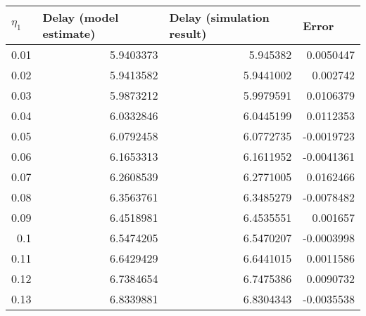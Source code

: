 \begin{table}
\begin{latin}
		\begin{tabular}{rrrr}
			\hline
			\multicolumn{1}{l}{$\eta_1$} & \multicolumn{1}{l}{Delay (model estimate)} & \multicolumn{1}{l}{Delay (simulation result)} & \multicolumn{1}{l}{Error} \\ \hline
			0.01                     & 5.9403373                                  & 5.945382                                      & 0.0050447                 \\
			0.02                     & 5.9413582                                  & 5.9441002                                     & 0.002742                  \\
			0.03                     & 5.9873212                                  & 5.9979591                                     & 0.0106379                 \\
			0.04                     & 6.0332846                                  & 6.0445199                                     & 0.0112353                 \\
			0.05                     & 6.0792458                                  & 6.0772735                                     & -0.0019723                \\
			0.06                     & 6.1653313                                  & 6.1611952                                     & -0.0041361                \\
			0.07                     & 6.2608539                                  & 6.2771005                                     & 0.0162466                 \\
			0.08                     & 6.3563761                                  & 6.3485279                                     & -0.0078482                \\
			0.09                     & 6.4518981                                  & 6.4535551                                     & 0.001657                  \\
			0.1                      & 6.5474205                                  & 6.5470207                                     & -0.0003998                \\
			0.11                     & 6.6429429                                  & 6.6441015                                     & 0.0011586                 \\
			0.12                     & 6.7384654                                  & 6.7475386                                     & 0.0090732                 \\
			0.13                     & 6.8339881                                  & 6.8304343                                     & -0.0035538                \\

\end{tabular}
\end{latin}
\end{table}
